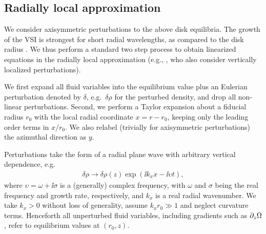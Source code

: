 \subsection{Radially local approximation}\label{sec:radlocal}
We consider axisymmetric perturbations to the above disk equilibria.    
The growth of the VSI is strongest for short radial wavelengths, as compared
 to the disk radius .  We thus perform a
 standard two step process to obtain linearized equations in the radially local 
 approximation (e.g., \citealp{goldreich67}, who also consider vertically localized perturbations).  
 
 We first expand all fluid variables 
 into the equilibrium value plus an Eulerian perturbation denoted by $\delta$, e.g.\ 
 $\delta \rho$ for the perturbed density, and drop all non-linear perturbations.  Second, we perform
 a Taylor expansion about a fiducial radius $r_0$ with the local radial coordinate
 $x = r - r_0$, keeping only the leading order terms in $x/r_0$.  We also relabel 
 (trivially for axisymmetric perturbations) the azimuthal direction as $y$.  
 
 Perturbations take the form of a radial plane wave with arbitrary vertical dependence, 
 e.g.\
 \begin{align}
  \delta\rho \rightarrow \delta\rho(z)\exp{\left(\ii k_x x - \ii\upsilon
      t\right)},    
\end{align}
where $\upsilon = \omega + \ii \sigma$ is a (generally) complex frequency, 
with $\omega$ and $\sigma$ being
the real frequency and growth rate, respectively, and $k_x$ is a real 
radial wavenumber.  We take $k_x>0$ without loss of generality, 
assume $k_xr_0 \gg 1$ and neglect curvature terms. 
Henceforth all unperturbed fluid variables, including 
gradients such as $\partial_z \Omega$, refer to  equilibrium values at $(r_0, z)$.

